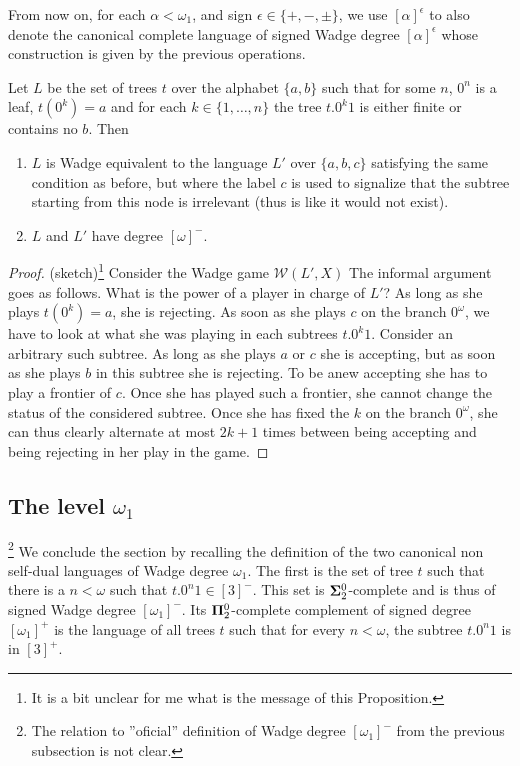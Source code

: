 From now on, for each $\alpha < \omega_1$, and sign $\epsilon \in \{+,-,\pm\}$, we use  $[\alpha]^\epsilon$ to also denote the canonical complete language of signed Wadge degree $[\alpha]^\epsilon$ whose construction is given by the previous operations.

\begin{proposition}\cite[Section 4.1]{bp}
\label{rem:example}
Let $L$ be the set of trees $t$ over the alphabet $\{a,b\}$ such that for some $n$, $0^n$ is a leaf, $t(0^k)=a$ and for each $k\in \{1, \dots, n\}$ the tree $t.0^k1$ is either finite or contains no $b$. Then
\begin{enumerate}
\item $L$ is Wadge equivalent to the language  $L'$ over $\{a, b, c\}$ satisfying the same condition as before, but where the label $c$ is used to signalize that the subtree starting from this node is irrelevant (thus is like it would not exist). 
\item $L$ and $L'$ have degree $[\omega]^-$. 
\end{enumerate}
\end{proposition}

\begin{proof}(sketch)\footnote{It is a bit unclear for me what is the message of this Proposition.} Consider the Wadge game $\mathcal{W}(L', X)$
The informal argument goes as follows. What is the power of a player in charge of $L'$? As long as she plays $t(0^k)=a$, she is rejecting. 
As soon as she plays $c$ on the branch $0^\omega$, we have to look at what she was playing in each subtrees  $t.0^k1$. Consider an arbitrary such subtree. As long as she plays $a$ or $c$ she is accepting, but as soon as she plays $b$ in this subtree she is rejecting. To be anew accepting she has to play a frontier of $c$. Once she has played such a frontier, she cannot change the status of the considered subtree. Once she has fixed the $k$ on the branch $0^\omega$, she can thus clearly alternate at most $2k+1$ times between being accepting and being rejecting in her play in the game. 
\end{proof}

\subsection{The level $\omega_1$}\footnote{The relation to ''oficial'' definition of Wadge degree $[\omega_1]^-$ from the previous subsection is not clear.}
We conclude the section by recalling the definition of the two canonical non self-dual languages of Wadge degree $\omega_1$. The first is the set of tree $t$ such that there is a $n<\omega$ such that $t.0^n1 \in [3]^-$. This set is ${\bf \Sigma}^0_2$-complete and is thus of signed Wadge degree $[\omega_1]^-$. Its ${\bf \Pi}^0_2$-complete complement of signed degree $[\omega_1]^+$ is the language of all trees $t$ such that for every $n<\omega$, the subtree $t.0^n1$ is in  $[3]^+$.

